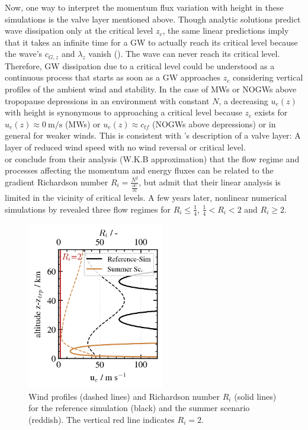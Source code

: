 Now, one way to interpret the momentum flux variation with height in these simulations is the valve layer mentioned above. Though analytic solutions predict wave dissipation only at the critical level $z_c$, the same linear predictions imply that it takes an infinite time for a GW to actually reach its critical level because the wave's $c_{G,z}$ and $\lambda_z$ vanish (\cite[]{lin_mesoscale_2007}). The wave can never reach its critical level. Therefore, GW dissipation due to a critical level could be understood as a continuous process that starts as soon as a GW approaches $z_c$ considering vertical profiles of the ambient wind and stability. In the case of MWs or NOGWs above tropopause depressions in an environment with constant $N$, a decreasing $u_e(z)$ with height is synonymous to approaching a critical level because $z_c$ exists for $u_e(z) \approx \SI{0}{\meter\per\second}$ (MWs) or $u_e(z) \approx c_{tf}$ (NOGWs above depressions) or in general for weaker winds. This is consistent with \textcite[]{kruse_midlatitude_2016}'s description of a valve layer: A layer of reduced wind speed with no wind reversal or critical level.
 \\
\textcite[]{bretherton_propagation_1966} or \textcite[]{booker_critical_1967} conclude from their analysis (W.K.B approximation) that the flow regime and processes affecting the momentum and energy fluxes can be related to the gradient Richardson number $R_i=\frac{N^2}{\frac{\partial U}{\partial z}}$, but admit that their linear analysis is limited in the vicinity of critical levels. A few years later, nonlinear numerical simulations by \textcite[]{breeding_non-linear_1971} revealed three flow regimes for $R_i \leq \frac{1}{4}$, $\frac{1}{4} < R_i < 2$ and $R_i \geq 2$.
\begin{figure}
    \includegraphics[width=6cm]{figures_q3D/critical-layer-ana.png}
    \caption{Wind profiles (dashed lines) and Richardson number $R_i$ (solid lines) for the reference simulation (black) and the summer scenario (reddish). The vertical red line indicates $R_i=2$.}
    \label{fig:ri}
\end{figure}
